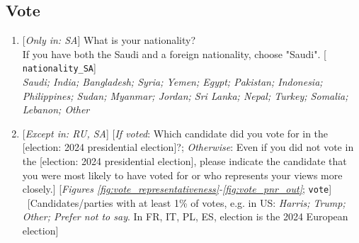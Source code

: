  \subsection*{Vote} 
 \begin{enumerate}[resume] 
\item  \label{q:nationality_SA} [\textit{Only in: SA}] What is your nationality?\\If you have both the Saudi and a foreign nationality, choose "Saudi". [%
\verb|nationality_SA|]
  \\ \textit{Saudi; India; Bangladesh; Syria; Yemen; Egypt; Pakistan; Indonesia; Philippines; Sudan; Myanmar; Jordan; Sri Lanka; Nepal; Turkey; Somalia; Lebanon; Other}

\item  \label{q:vote} [\textit{Except in: RU, SA}] [\textit{If voted}: Which candidate did you vote for in the [election: 2024 presidential election]?; \textit{Otherwise}: Even if you did not vote in the [election: 2024 presidential election], please indicate the candidate that you were most likely to have voted for or who represents your views more closely.] [\textit{Figures \ref{fig:vote_representativeness}-\ref{fig:vote_pnr_out}}; 
\verb|vote|]
  \\ ~[Candidates/parties with at least 1\% of votes, e.g. in US: \textit{Harris; Trump; Other; Prefer not to say}. In FR, IT, PL, ES, election is the 2024 European election]




\end{enumerate}
